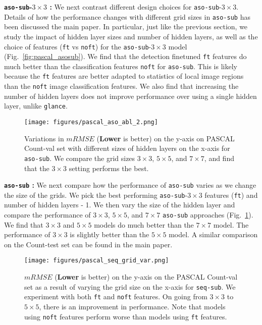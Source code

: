 \documentclass[10pt,twocolumn,letterpaper]{article}
\newcommand{\sub}{\texttt{aso-sub}\xspace}
\newcommand{\seq}{\texttt{seq-sub}\xspace}
\newcommand{\glance}{\texttt{glance}\xspace}
\newcommand{\reffig}[1]{Fig.~\ref{#1}}
\begin{document}
\textbf{\sub-\texttt{$3\times3$} : }
We next contrast different design choices for \sub-\texttt{$3\times3$}. Details of how the performance changes with different grid sizes in \sub has been discussed the main paper. In particular, just like the previous section, we study the impact of hidden layer sizes and number of hidden layers, as well as the choice of features (\texttt{ft} vs \texttt{noft}) for the \sub-\texttt{$3\times3$} model (\reffig{fig:pascal_asosub}). We find that the detection finetuned \texttt{ft} features do much better than the classification features \texttt{noft} for \sub. This is likely because the \texttt{ft} features are better adapted to statistics of local image regions than the \texttt{noft} image classification features. We also find that increasing the number of hidden layers does not improve performance over using a single hidden layer, unlike \glance. 

\begin{figure}
\texttt{[image: figures/pascal\_aso\_abl\_2.png]}
\caption{Variations in $mRMSE$ (\textbf{Lower} is better) on the y-axis on PASCAL Count-val set with different sizes of hidden layers on the x-axis for \sub. We compare the grid sizes $3\times3$, $5\times5$, and $7\times7$, and find that the $3\times3$ setting performs the best.}
\label{fig:pascal_asosubfine}
\end{figure}



\textbf{\sub{} : }
We next compare how the performance of \sub varies as we change the size of the grids. We pick the best performing \sub-\texttt{$3\times3$} features (\texttt{ft}) and number of hidden layers - 1. We then vary the size of the hidden layer and compare the performance of $3\times3$, $5\times5$, and $7\times7$ \sub approaches (\reffig{fig:pascal_asosubfine}). We find that $3\times3$ and $5\times5$ models do much better than the $7\times7$ model. The performance of $3\times3$ is slightly better than the $5\times5$ model. A similar comparison on the Count-test set can be found in the main paper.


\begin{figure}
\texttt{[image: figures/pascal\_seq\_grid\_var.png]}
\caption{$mRMSE$ (\textbf{Lower} is better) on the y-axis on the PASCAL Count-val set as a result of varying the grid size on the x-axis for \seq. We experiment with both \texttt{ft} and \texttt{noft} features. On going from $3\times3$ to $5\times5$, there is an improvement in performance. Note that models using \texttt{noft} features perform worse than models using \texttt{ft} features.}
\label{fig:pascal_seq}
\end{figure}
\end{document}
